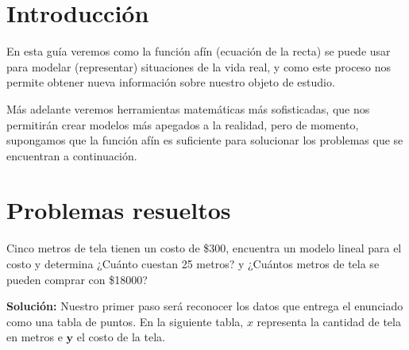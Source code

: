 \documentclass{ceas2}
\begin{document}
\datos
\section{Introducción}

En esta guía veremos como la función afín (ecuación de la recta) se puede usar para 
modelar (representar) situaciones de la vida real, y como este proceso nos permite
obtener nueva información sobre nuestro objeto de estudio.\par

Más adelante veremos herramientas matemáticas más sofisticadas, que nos permitirán crear
modelos más apegados a la realidad, pero de momento, supongamos que la función afín 
es suficiente para solucionar los problemas que se encuentran a continuación.

\section{Problemas resueltos}

\e Cinco metros de tela tienen un costo de \$300, encuentra un modelo
lineal para el costo y determina ¿Cuánto cuestan 25 metros? y ¿Cuántos metros
de tela se pueden comprar con \$18000? 

{\bfseries Solución:} Nuestro primer paso será reconocer los 
datos que entrega el enunciado como una tabla de puntos. En la siguiente 
tabla, $x$ representa la cantidad de tela en metros e $\boldsymbol y$ 
el costo de la tela.

\def\tabla{%
\begin{mtabla}{}
    x & y \\
    5 & 300 \\
    0 & 0 
\end{mtabla}
}
\end{document}

